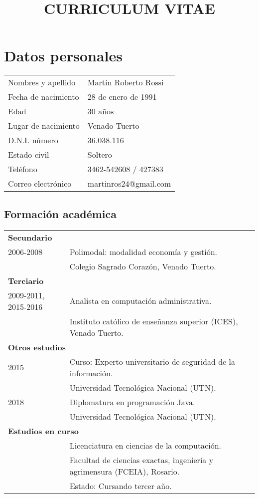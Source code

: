 \documentclass[12pt]{article}
\title{\huge{\textbf{CURRICULUM VITAE}}\vspace{-2.5ex}}
\date{}
\begin{document}
\maketitle
\section*{Datos personales}
\bgroup
\def\arraystretch{1.25}
\begin{tabular}{p{5cm} l}
  Nombres y apellido&Martín Roberto Rossi\\
  Fecha de nacimiento&28 de enero de 1991\\
  Edad&30 años\\
  Lugar de nacimiento&Venado Tuerto\\
  D.N.I. número&36.038.116\\
  Estado civil&Soltero\\
  Teléfono&3462-542608 / 427383\\
  Correo electrónico&martinros24@gmail.com\\
\end{tabular}
\setlength{\unitlength}{0.5cm}
\subsection*{Formación académica}
\begin{tabular}{p{3.8cm} l}
  \multicolumn{2}{l}{\textbf{Secundario}}\\
  2006-2008&Polimodal: modalidad economía y gestión.\\
           &\small{Colegio Sagrado Corazón, Venado Tuerto.}\\
  \multicolumn{2}{l}{\textbf{Terciario}}\\
  2009-2011, 2015-2016&Analista en computación administrativa.\\
           &\small{Instituto católico de enseñanza superior (ICES), Venado Tuerto.}\\
  \multicolumn{2}{l}{\textbf{Otros estudios}}\\
  2015&Curso: Experto universitario de seguridad de la información.\\
           &\small{Universidad Tecnológica Nacional (UTN).}\\
  2018&Diplomatura en programación Java.\\
           &\small{Universidad Tecnológica Nacional (UTN).}\\
  \multicolumn{2}{l}{\textbf{Estudios en curso}}\\
           &Licenciatura en ciencias de la computación.\\
           &\small{Facultad de ciencias exactas, ingeniería y agrimensura (FCEIA), Rosario.}\\
           &\small{Estado: Cursando tercer año.}\\
\end{tabular}
\end{document}
